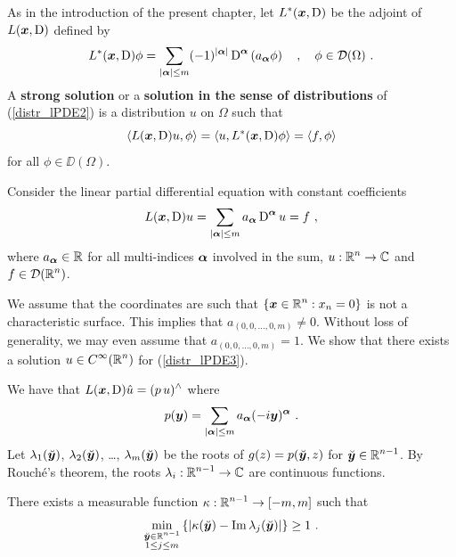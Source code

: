 As in the introduction of the present chapter, let
$\displaystyle L^\ast({\bm{x}}, \operatorname{D})$ 
be the adjoint of $L({\bm{x}}, \operatorname{D})$ defined by
\[
L^\ast({\bm{x}},\operatorname{D})\phi = \sum_{|{\bm{\alpha}}|\leq m} (-1)^{|{\bm{\alpha}}|}
\operatorname{D}^{{\bm{\alpha}}} \left(a_{{\bm{\alpha}}} \phi \right) \quad , \quad \phi \in
\mathcal{D}(\Omega) \ .
\]
A {\bfseries strong solution} or a
{\bfseries solution in the sense of distributions}
of (\ref{distr_lPDE2}) is a distribution $u$ on $\Omega$ such that
\[
\left\langle{L({\bm{x}},\operatorname{D})u} , {\phi}\right\rangle = \left\langle{u} , {L^\ast({\bm{x}},\operatorname{D})\phi}\right\rangle =
\left\langle{f} , {\phi}\right\rangle
\]
for all $\phi \in \DD(\Omega)$.

Consider the linear partial differential equation with constant coefficients
\begin{equation} \label{distr_lPDE3}
L({\bm{x}},\operatorname{D})u = \sum_{|{\bm{\alpha}}|\leq m} a_{{\bm{\alpha}}}
\operatorname{D}^{{\bm{\alpha}}} u = f \  ,
\end{equation}
where $a_{{\bm{\alpha}}} \in \mathbb{R}$ for all multi-indices ${\bm{\alpha}}$
involved in the sum, $\displaystyle u:\mathbb{R}^n \rightarrow \mathbb{C}$ and
$\displaystyle f \in \mathcal{D}(\mathbb{R}^n)$.

We assume that the coordinates are such that
$\displaystyle \{ {\bm{x}} \in \mathbb{R}^n : x_n=0 \}$ is not a characteristic surface.
This implies that $a_{(0,0,\ldots,0,m)} \neq 0$.  Without loss of
generality, we may even assume that $a_{(0,0,\ldots,0,m)} = 1$.
We show that there exists a solution $\displaystyle u \in C^\infty(\mathbb{R}^n)$ for
(\ref{distr_lPDE3}).

We have that $\displaystyle L({\bm{x}},\operatorname{D})\hat{u} = (p\, u)^\wedge$ where
\begin{equation} \label{distr_lPDE3_ex1}
p({\bm{y}}) = \sum_{|{\bm{\alpha}}|\leq m} a_{{\bm{\alpha}}}
(-i{\bm{y}})^{{\bm{\alpha}}} \ .
\end{equation}
Let $\lambda_1(\breve{{\bm{y}}})$, $\lambda_2(\breve{{\bm{y}}})$, \ldots,
$\lambda_m(\breve{{\bm{y}}})$ be the roots of
$\displaystyle g(z) = p(\breve{{\bm{y}}}, z)$ for
$\displaystyle \breve{{\bm{y}}}\in \mathbb{R}^{n-1}$.
By Rouch\'e's theorem, the roots
$\displaystyle \lambda_i:\mathbb{R}^{n-1} \rightarrow \mathbb{C}$
are continuous functions.

\begin{lemma} \label{distr_lPDE3_ex2}
There exists a measurable function
$\displaystyle \kappa:\mathbb{R}^{n-1}\rightarrow [-m,m]$ such that
\[
\min_{\substack{\breve{{\bm{y}}} \in \mathbb{R}^{n-1}\\ 1\leq j \leq m}}
\left\{ \left|\kappa(\breve{{\bm{y}}})
- \operatorname{Im} \lambda_j(\breve{{\bm{y}}})\right| \right\} \geq 1 \ .
\]
\end{lemma}

